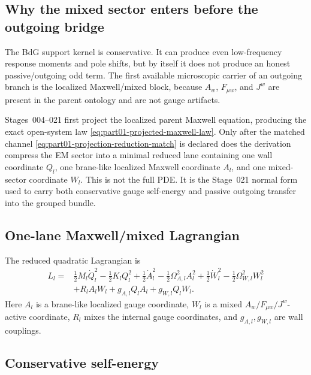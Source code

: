 \subsection{Why the mixed sector enters before the outgoing bridge}
\label{subsec:part01-mixed-bridge-purpose}

The BdG support kernel is conservative.  It can produce even low-frequency response moments and pole shifts, but by itself it does not produce an honest passive/outgoing odd term.  The first available microscopic carrier of an outgoing branch is the localized Maxwell/mixed block, because \(A_w\), \(F_{\mu w}\), and \(J^w\) are present in the parent ontology and are not gauge artifacts.

Stages~004--021 first project the localized parent Maxwell equation, producing the exact open-system law \eqref{eq:part01-projected-maxwell-law}.  Only after the matched channel \eqref{eq:part01-projection-reduction-match} is declared does the derivation compress the EM sector into a minimal reduced lane containing one wall coordinate \(Q_l\), one brane-like localized Maxwell coordinate \(A_l\), and one mixed-sector coordinate \(W_l\).  This is not the full PDE.  It is the Stage~021 normal form used to carry both conservative gauge self-energy and passive outgoing transfer into the grouped bundle.

\subsection{One-lane Maxwell/mixed Lagrangian}
\label{subsec:part01-maxwell-mixed-L}

The reduced quadratic Lagrangian is
\begin{equation}
\label{eq:part01-maxwell-mixed-L}
\begin{aligned}
L_l={}&\frac12M_l\dot Q_l^2-\frac12K_lQ_l^2
+\frac12\dot A_l^2-\frac12\Omega_{A,l}^2A_l^2
+\frac12\dot W_l^2-\frac12\Omega_{W,l}^2W_l^2 \\
&+R_lA_lW_l+g_{A,l}Q_lA_l+g_{W,l}Q_lW_l .
\end{aligned}
\end{equation}
Here \(A_l\) is a brane-like localized gauge coordinate, \(W_l\) is a mixed \(A_w/F_{\mu w}/J^w\)-active coordinate, \(R_l\) mixes the internal gauge coordinates, and \(g_{A,l},g_{W,l}\) are wall couplings.

\subsection{Conservative self-energy}
\label{subsec:part01-conservative-maxwell-self-energy}

